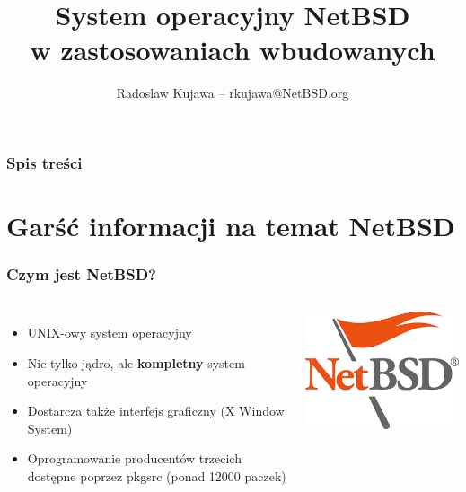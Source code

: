\documentclass[dvipsnames,table]{beamer}
\title{System operacyjny NetBSD\\ w zastosowaniach wbudowanych}
\author{Radoslaw Kujawa -- rkujawa@NetBSD.org}
\institute{The NetBSD Foundation / OSEC}
\begin{document}
\begin{frame}
\titlepage
\end{frame}

\begin{frame}[allowframebreaks]
\frametitle{Spis treści}
{
\hypersetup{colorlinks=true,linkcolor=black,urlcolor=NetBSD-orange}
\tableofcontents
}
\end{frame}

\section{Garść informacji na temat NetBSD}

\begin{frame}
\frametitle{Czym jest NetBSD?}
\begin{columns}[c]
\column{3in}
\begin{itemize}
	\item UNIX-owy system operacyjny
	\item Nie tylko jądro, ale \textbf{kompletny} system operacyjny
	\item Dostarcza także interfejs graficzny (X Window System)
	\item Oprogramowanie producentów trzecich dostępne poprzez pkgsrc (ponad 12000 paczek)
\end{itemize}
\column{1in}
\includegraphics[scale=0.25]{NetBSD.png}
\end{columns}
\end{frame}
\end{document}
